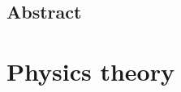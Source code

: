 \documentclass[11pt, a4paper]{book}
\numberwithin{equation}{chapter}
\begin{document}

\section*{Abstract}


\newpage
\thispagestyle{empty}

\setcounter{tocdepth}{2}
\renewcommand{\baselinestretch}{1.22}\normalsize

\thispagestyle{empty}
\tableofcontents
\renewcommand{\baselinestretch}{1.3}\normalsize


%

\chapter{Physics theory}

\label{chap:Physics theory}



%


%
\end{document}
